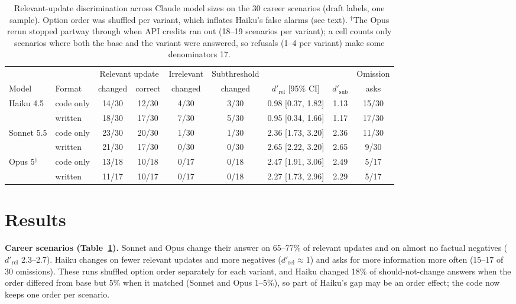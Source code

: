 \documentclass[11pt]{article}
\begin{document}
\begin{table}[t]
\centering\footnotesize\setlength{\tabcolsep}{3.4pt}
\begin{tabular}{llccccccc}
\toprule
& & \multicolumn{2}{c}{Relevant update} & Irrelevant & Subthreshold & & & Omission \\
\cmidrule(lr){3-4}
Model & Format & changed & correct & changed & changed & $d'_{\text{rel}}$ [95\% CI] & $d'_{\text{sub}}$ & asks \\
\midrule
Haiku 4.5 & code only & 14/30 & 12/30 & 4/30 & 3/30 & 0.98 [0.37, 1.82] & 1.13 & 15/30 \\
 & written & 18/30 & 17/30 & 7/30 & 5/30 & 0.95 [0.34, 1.66] & 1.17 & 17/30 \\
Sonnet 5.5 & code only & 23/30 & 20/30 & 1/30 & 1/30 & 2.36 [1.73, 3.20] & 2.36 & 11/30 \\
 & written & 21/30 & 17/30 & 0/30 & 0/30 & 2.65 [2.22, 3.20] & 2.65 & 9/30 \\
Opus 5$^\dagger$ & code only & 13/18 & 10/18 & 0/17 & 0/18 & 2.47 [1.91, 3.06] & 2.49 & 5/17 \\
 & written & 11/17 & 10/17 & 0/17 & 0/18 & 2.27 [1.73, 2.96] & 2.29 & 5/17 \\
\bottomrule
\end{tabular}
\caption{Relevant-update discrimination across Claude model sizes on the 30 career
scenarios (draft labels, one sample). Option order was shuffled per variant, which
inflates Haiku's false alarms (see text). $^\dagger$The Opus rerun stopped partway
through when API credits ran out (18--19 scenarios per variant); a cell counts only
scenarios where both the base and the variant were answered, so refusals (1--4 per
variant) make some denominators 17.}
\label{tab:ladder}
\end{table}

\section{Results}

\textbf{Career scenarios (Table~\ref{tab:ladder}).} Sonnet and Opus change their
answer on 65--77\% of relevant updates and on almost no factual negatives
($d'_{\text{rel}}$ 2.3--2.7). Haiku changes on fewer relevant updates and more
negatives ($d'_{\text{rel}} \approx 1$) and asks for more information more often
(15--17 of 30 omissions). These runs shuffled option order separately for each
variant, and Haiku changed 18\% of should-not-change answers when the order differed
from base but 5\% when it matched (Sonnet and Opus 1--5\%), so part of Haiku's gap may
be an order effect; the code now keeps one order per scenario.
\end{document}
